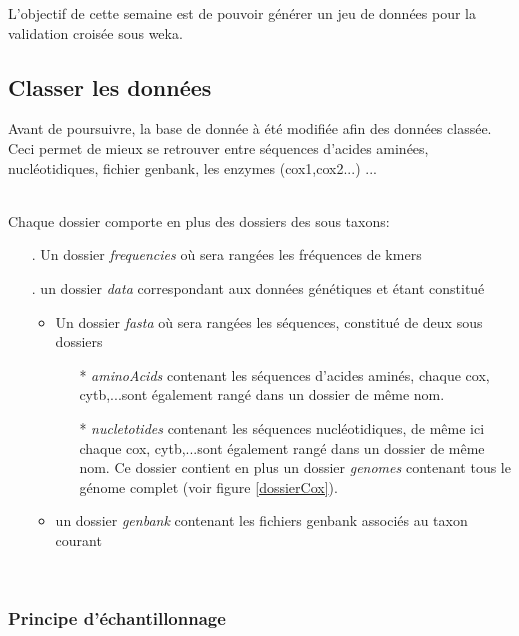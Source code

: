 L'objectif de cette semaine est de pouvoir générer un jeu de données pour la validation croisée sous weka.

\subsection{Classer les données}

Avant de poursuivre, la base de donnée à été modifiée afin des données classée. Ceci permet de mieux se retrouver entre séquences d'acides aminées, nucléotidiques, fichier genbank, les enzymes (cox1,cox2...) ...

~\\
Chaque dossier comporte en plus des dossiers des sous taxons:

\begin{itemize}
 \item[.]Un dossier \textit{frequencies} où sera rangées les fréquences de kmers
  \item[.]un dossier \textit{data} correspondant aux données génétiques et étant constitué
  \begin{itemize}
 \item Un dossier \textit{fasta} où sera rangées les séquences, constitué de deux sous dossiers 
  \begin{itemize}
 \item[*]\textit{aminoAcids} contenant les séquences d'acides aminés, chaque cox, cytb,...sont également rangé dans un dossier de même nom. 
 
  \item[*]\textit{nucletotides} contenant les séquences nucléotidiques, de même ici chaque cox, cytb,...sont également rangé dans un dossier de même nom. Ce dossier contient en plus un dossier \textit{genomes} contenant tous le génome complet (voir figure \ref{dossierCox}).
  
\end{itemize}
  \item un dossier \textit{genbank} contenant les fichiers genbank associés au taxon courant
  
\end{itemize}
\end{itemize}
~\\



\subsubsection{Principe d'échantillonnage}

